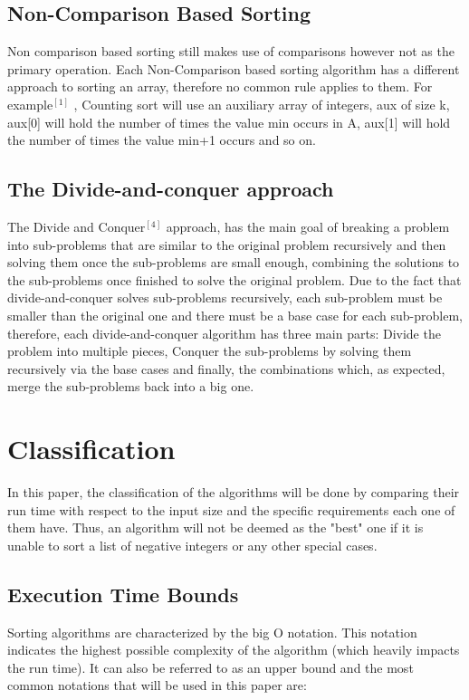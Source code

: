 \documentclass{article}
\begin{document}
\subsection{Non-Comparison Based Sorting}
Non comparison based sorting still makes use of comparisons however not as the primary operation. Each Non-Comparison based sorting algorithm has a different approach to sorting an array, therefore no common rule applies to them. For example$^{[1]}$ , Counting sort will use an auxiliary array of integers, aux of size k, aux[0] will hold the number of times the value min occurs in A, aux[1] will hold the number of times the value min+1 occurs and so on.

\subsection{The Divide-and-conquer approach}
The Divide and Conquer$^{[4]}$ approach, has the main goal of breaking a problem into sub-problems that are similar to the original problem recursively and then solving them once the sub-problems are small enough, combining the solutions to the sub-problems once finished to solve the original problem. Due to the fact that divide-and-conquer solves sub-problems recursively, each sub-problem must be smaller than the original one and there must be a base case for each sub-problem, therefore, each divide-and-conquer algorithm has three main parts: Divide the problem into multiple pieces, Conquer the sub-problems by solving them recursively via the base cases and finally, the combinations which, as expected, merge the sub-problems back into a big one.

\section{Classification}
In this paper, the classification of the algorithms will be done by comparing their run time with respect to the input size and the specific requirements each one of them have. Thus, an algorithm will not be deemed as the "best" one if it is unable to sort a list of negative integers or any other special cases.

\subsection{Execution Time Bounds}
Sorting algorithms are characterized by the big O notation. This notation indicates the highest possible complexity of the algorithm (which heavily impacts the run time). It can also be referred to as an upper bound and the most common notations that will be used in this paper are:
\end{document}
